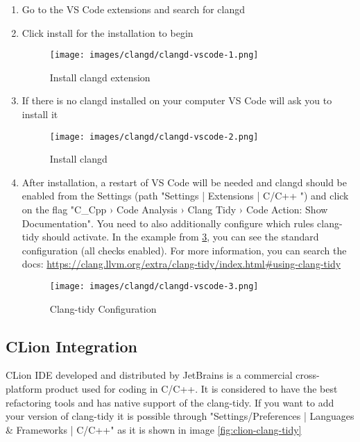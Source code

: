 \begin{enumerate}
  \item Go to the VS Code extensions and search for clangd
  \item Click install for the installation to begin
        \begin{figure}[H]
	   \centering
            \caption{Install clangd extension}
	   \texttt{[image: images/clangd/clangd-vscode-1.png]}
	   \label{fig:vscode-clangd-01}
        \end{figure}
  \item If there is no clangd installed on your computer VS Code will ask you to install it
        \begin{figure}[H]
	   \centering
            \caption{Install clangd}
	   \texttt{[image: images/clangd/clangd-vscode-2.png]}
	   \label{fig:vscode-clangd-02}
        \end{figure}
    \item After installation, a restart of VS Code will be needed and clangd should be enabled from the Settings (path  "Settings | Extensions | C/C++ ") and click on the flag "C\_Cpp › Code Analysis › Clang Tidy › Code Action: Show Documentation". You need to also additionally configure which rules clang-tidy should activate. In the example from \ref{fig:vscode-clangd-03}, you can see the standard configuration (all checks enabled). For more information, you can search the docs: \url{https://clang.llvm.org/extra/clang-tidy/index.html#using-clang-tidy}
        \begin{figure}[H]
	   \centering
            \caption{Clang-tidy Configuration}
	   \texttt{[image: images/clangd/clangd-vscode-3.png]}
	   \label{fig:vscode-clangd-03}
        \end{figure}
\end{enumerate}

\subsection{CLion Integration}

CLion IDE developed and distributed by JetBrains is a commercial cross-platform product used for coding in C/C++. It is considered to have the best refactoring tools and has native support of the clang-tidy. If you want to add your version of clang-tidy it is possible through "Settings/Preferences | Languages \& Frameworks | C/C++" as it is shown in image \ref{fig:clion-clang-tidy} 


